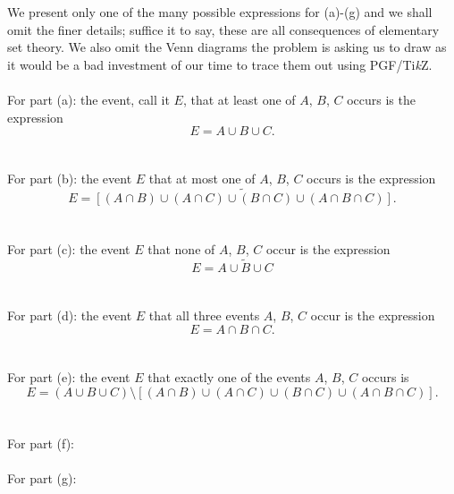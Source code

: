 \begin{solution*}
  We present only one of the many possible expressions for (a)-(g) and we
  shall omit the finer details; suffice it to say, these are all
  consequences of elementary set theory. We also omit the Venn diagrams the
  problem is asking us to draw as it would be a bad investment of our time
  to trace them out using PGF/Ti\textit{k}Z.
  \\\\
  For part (a): the event, call it \(E\), that at least one of \(A\),
  \(B\), \(C\) occurs is the expression
  \[
    E=A\cup B\cup C.
  \]
  \\\\
  For part (b): the event \(E\) that at most one of \(A\), \(B\), \(C\)
  occurs is the expression
  \[
    E=\widetilde{\left[(A\cap B)\cup (A\cap C)\cup (B\cap C)\cup (A\cap
      B\cap C)\right]}.
  \]
  \\\\
  For part (c): the event \(E\) that none of \(A\), \(B\), \(C\) occur is
  the expression
  \[
    E=\widetilde{A\cup B\cup C}
  \]
  \\\\
  For part (d): the event \(E\) that all three events \(A\), \(B\), \(C\)
  occur is the expression
  \[
    E=A\cap B\cap C.
  \]
  \\\\
  For part (e): the event \(E\) that exactly one of the events \(A\),
  \(B\), \(C\) occurs is
  \[
    E=(A\cup B\cup C)\setminus \left[(A\cap B)\cup (A\cap C)\cup (B\cap
      C)\cup (A\cap B\cap C)\right].
  \]
  \\\\
  For part (f):
  \\\\
  For part (g):
\end{solution*}

\begin{problem}
\end{problem}
\begin{solution*}
\end{solution*}

\begin{problem}
\end{problem}
\begin{solution*}
\end{solution*}

\begin{problem}
\end{problem}
\begin{solution*}
\end{solution*}

